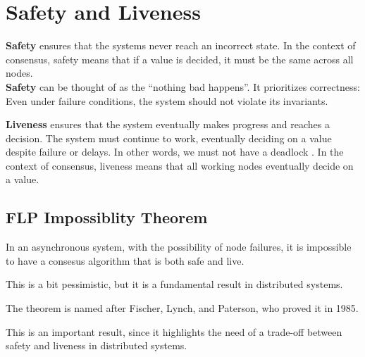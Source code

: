 \section{Safety and Liveness}

\textbf{Safety} ensures that the systems never reach an incorrect state. In the context of consensus, safety means that if a value is decided, it must be the same across all nodes.\\
\textbf{Safety} can be thought of as the ``nothing bad happens''.
It prioritizes correctness: Even under failure conditions, the system should not violate its invariants.

\textbf{Liveness} ensures that the system eventually makes progress and reaches a decision.
The system must continue to work, eventually deciding on a value despite failure or delays.
In other words, we must not have a deadlock \smiley.
In the context of consensus, liveness means that all working nodes eventually decide on a value.




\subsection{FLP Impossiblity Theorem}
\begin{definition}
   In an asynchronous system, with the possibility of node failures, it is impossible to have a consesus algorithm that is both safe and live.
\end{definition}
This is a bit pessimistic, but it is a fundamental result in distributed systems.

The theorem is named after Fischer, Lynch, and Paterson, who proved it in 1985.


This is an important result, since it highlights the need of a trade-off between safety and liveness in distributed systems.

